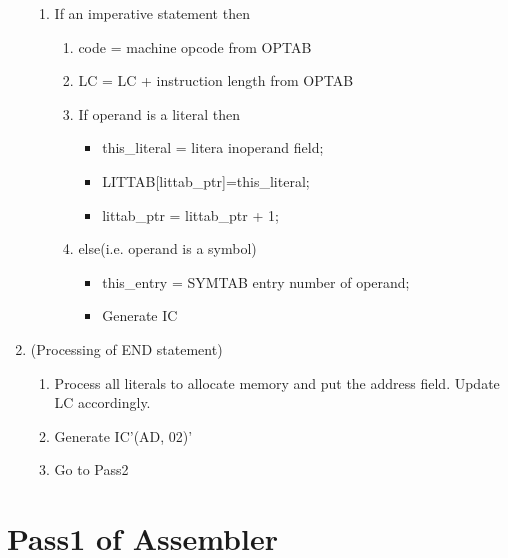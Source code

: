 \documentclass{scrreprt}
\begin{document}
\begin{enumerate}
\begin{enumerate}
\item If an imperative statement then
\begin{enumerate}
\item code  = machine opcode from OPTAB
\item LC = LC + instruction length from OPTAB
\item If operand is a literal then
\begin{itemize}
\item[]this_literal = litera inoperand field;
\item[]LITTAB[littab_ptr]=this_literal;
\item[]littab_ptr = littab_ptr + 1;
\end{itemize}
\item else(i.e. operand is a symbol)
\begin{itemize}
\item[]this_entry = SYMTAB entry number of operand;
\item[]Generate IC
\end{itemize}
\end{enumerate}
\end{enumerate}

\item (Processing of END statement)
\begin{enumerate}
\item Process all literals to allocate memory and put the address field. Update LC accordingly.
\item Generate IC'(AD, 02)'
\item Go to Pass2
\end{enumerate}
\end{enumerate}

\section{Pass1 of Assembler}
\end{document}
